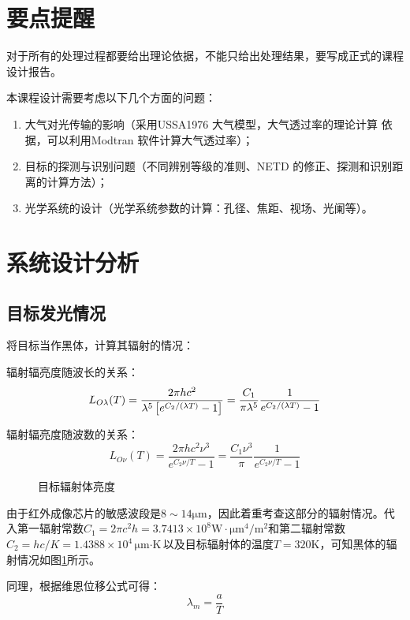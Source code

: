 \documentclass[11pt]{article}
\begin{document}
\section{要点提醒}
对于所有的处理过程都要给出理论依据，不能只给出处理结果，要写成正式的课程设计报告。\par
本课程设计需要考虑以下几个方面的问题：
\begin{enumerate}
  \item 大气对光传输的影响（采用USSA1976 大气模型，大气透过率的理论计算  依据，可以利用Modtran 软件计算大气透过率）；
  \item 目标的探测与识别问题（不同辨别等级的准则、NETD 的修正、探测和识别距离的计算方法）；
  \item 光学系统的设计（光学系统参数的计算：孔径、焦距、视场、光阑等）。
\end{enumerate}
\section{系统设计分析}
\subsection{目标发光情况}
将目标当作黑体，计算其辐射的情况：\par
辐射辐亮度随波长的关系：
\begin{equation}
  L_{O\lambda}(T)=\frac{2\pi hc^2}{\lambda^5 \left[e^{C_2/(\lambda T)}-1\right]}=\frac{C_1}{\pi\lambda^5}\frac{1}{e^{C_2/(\lambda T)}-1}
  \label{forem:普朗克公式，辐亮度，波长}
\end{equation}

辐射辐亮度随波数的关系：
\begin{equation}
  L_{O\nu}(T)=\frac{2\pi hc^2\nu^3}{e^{C_2\nu/T}-1}=\frac{C_1\nu^3}{\pi}\frac{1}{e^{C_2\nu/T}-1}
  \label{forem:普朗克公式，辐亮度，波数}
\end{equation}


\begin{figure}[H]
  \centering
  \centering
  \caption{目标辐射体亮度}
  \label{fig:普朗克公式}
\end{figure}
由于红外成像芯片的敏感波段是$8\sim14\unit{\um}$，因此着重考查这部分的辐射情况。代入第一辐射常数$C_1=2\pi c^2h=3.7413\times 10^8\unit{\W\cdot \um^4/\m^2}$和第二辐射常数$C_2=hc/K=1.4388\times 10^4\unit{\um\cdot \K}$以及目标辐射体的温度$T=320\unit{\K}$，可知黑体的辐射情况如图\ref{fig:普朗克公式}所示。\par
同理，根据维恩位移公式可得：
\begin{equation}
  \lambda_m=\frac{a}{T}
  \label{forem:维恩位移公式}
\end{equation}
\end{document}
